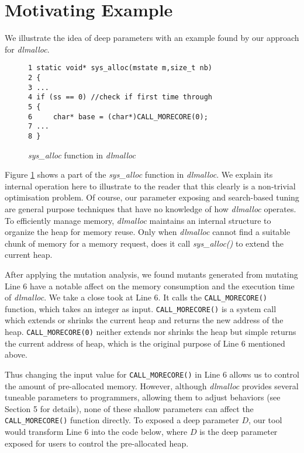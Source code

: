 
\section{Motivating Example}

We illustrate the idea of deep parameters with an example found by our approach for \emph{dlmalloc}.

\begin{figure}[ht]
\begin{lstlisting}
1 static void* sys_alloc(mstate m,size_t nb) 
2 {
3 ...
4 if (ss == 0) //check if first time through
5 { 
6     char* base = (char*)CALL_MORECORE(0);
7 ...
8 }
\end{lstlisting}
\vspace{-1.5em}
\caption{\emph{sys\_alloc} function in \emph{dlmalloc}}
\label{exp}
\end{figure}

Figure \ref{exp} shows a part of the \emph{sys\_alloc} function in \emph{dlmalloc}. We explain its internal operation here to illustrate to the reader that this clearly is a non-trivial optimisation problem. Of course, our parameter exposing and search-based tuning are general purpose techniques that have no knowledge of how \emph{dlmalloc} operates. To efficiently manage memory, \emph{dlmalloc} maintains an internal structure to organize the heap for memory reuse. Only when \emph{dlmalloc} cannot find a suitable chunk of memory for a memory request, does it call \emph{sys\_alloc()} to extend the current heap.

After applying the mutation analysis, we found mutants generated from mutating Line 6 have a notable affect on the memory consumption and the execution time of \emph{dlmalloc}. We take a close took at Line 6. It calls the {\tt CALL\_MORECORE()} function, which takes an integer as input. {\tt CALL\_MORECORE()} is a system call which extends or shrinks the current heap and returns the new address of the heap. {\tt CALL\_MORECORE(0)} neither extends nor shrinks the heap but simple returns the current address of heap, which is the original purpose of Line 6 mentioned above.

Thus changing the input value for {\tt CALL\_MORECORE()} in Line 6 allows us to control the amount of pre-allocated memory. However, although \emph{dlmalloc} provides several tuneable parameters to programmers, allowing them to adjust behaviors (see Section 5 for details), none of these shallow parameters can affect the {\tt CALL\_MORECORE()} function directly. To exposed a deep parameter $D$, our tool would transform Line 6 into the code below, where $D$ is the deep parameter exposed for users to control the pre-allocated heap.

